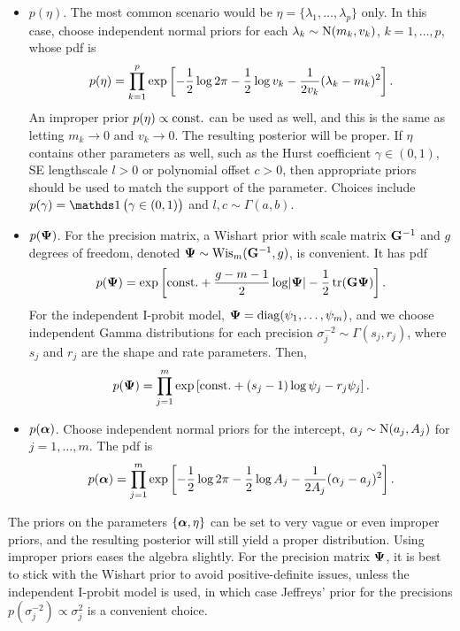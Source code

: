 \begin{itemize}
  \item {\boldmath$p(\eta)$}. The most common scenario would be $\eta = \{\lambda_1,\dots,\lambda_p\}$ only. In this case, choose independent normal priors for each $\lambda_k \sim \N(m_k,v_k)$, $k=1,\dots,p$, whose pdf is
  \begin{align*}
    p(\eta) = \prod_{k=1}^p \exp\left[-\half\log 2\pi - \half\log v_k - \frac{1}{2v_k} (\lambda_k - m_k)^2 \right].
  \end{align*} 
  An improper prior $p(\eta) \propto \const$ can be used as well, and this is the same as letting $m_k \to 0$ and $v_k\to 0$.
  The resulting posterior will be proper.
  If $\eta$ contains other parameters as well, such as the Hurst coefficient $\gamma \in (0,1)$, SE lengthscale $l >0$ or polynomial offset $c>0$, then appropriate priors should be used to match the support of the parameter.
  Choices include $p(\gamma) = \ind\big(\gamma \in (0,1)\big)$ and $l,c \sim \Gamma(a,b)$.
  
  \item {\boldmath$p(\bPsi)$}. For the precision matrix, a Wishart prior with scale matrix $\bG^{-1}$ and $g$ degrees of freedom, denoted $\bPsi \sim \Wis_m(\bG^{-1},g)$, is convenient. It has pdf
  \[
    p(\bPsi) = \exp\left[\const + \half[g-m-1]\log \abs{\bPsi} - \half\tr(\bG\bPsi)  \right].
  \]
  For the independent I-probit model, $\bPsi = \diag(\psi_1,\dots,\psi_m)$, and we choose independent Gamma distributions for each precision $\sigma_j^{-2} \sim \Gamma(s_j,r_j)$, where $s_j$ and $r_j$ are the shape and rate parameters.
  Then,
  \[
    p(\bPsi) = \prod_{j=1}^m \exp\left[\const + (s_j - 1)\log \psi_j - r_j\psi_j \right].
  \] 
  
  \item {\boldmath$p(\balpha)$}. Choose independent normal priors for the intercept, $\alpha_j \sim \N(a_j,A_j)$ for $j=1,\dots,m$. The pdf is
  \[
    p(\balpha) = \prod_{j=1}^m \exp\left[
    -\half\log 2\pi - \half\log A_j - \frac{1}{2A_j} (\alpha_j - a_j)^2  
    \right].
  \]
\end{itemize}

\begin{remark}
  The priors on the parameters $\{ \balpha,\eta \}$ can be set to very vague or even improper priors, and the resulting posterior will still yield a proper distribution.
  Using improper priors eases the algebra slightly.
  For the precision matrix $\bPsi$, it is best to stick with the Wishart prior to avoid positive-definite issues, unless the independent I-probit model is used, in which case Jeffreys' prior for the precisions $p(\sigma_j^{-2})\propto \sigma_j^2$ is a convenient choice.
\end{remark}

